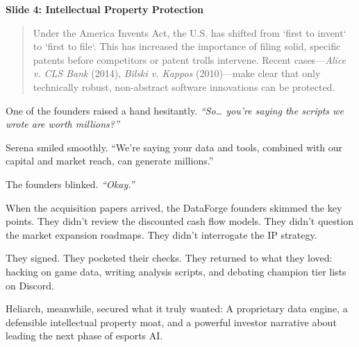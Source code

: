 \textbf{Slide 4: Intellectual Property Protection} \\

\begin{quote}
    Under the America Invents Act, the U.S. has shifted from `first to invent` to `first to file`. This has increased the importance of filing solid, specific patents before competitors or patent trolls intervene. Recent cases—\textit{Alice v. CLS Bank} (2014), \textit{Bilski v. Kappos} (2010)—make clear that only technically robust, non-abstract software innovations can be protected.
\end{quote}

One of the founders raised a hand hesitantly.  
\textit{``So… you’re saying the scripts we wrote are worth millions?''}

Serena smiled smoothly.  
``We’re saying your data and tools, combined with our capital and market reach, can generate millions.''

The founders blinked.  
\textit{``Okay.''}

When the acquisition papers arrived, the DataForge founders skimmed the key points. They didn’t review the discounted cash flow models. They didn’t question the market expansion roadmaps. They didn’t interrogate the IP strategy.

They signed.  
They pocketed their checks.  
They returned to what they loved: hacking on game data, writing analysis scripts, and debating champion tier lists on Discord.

Heliarch, meanwhile, secured what it truly wanted:  
A proprietary data engine, a defensible intellectual property moat, and a powerful investor narrative about leading the next phase of esports AI.

